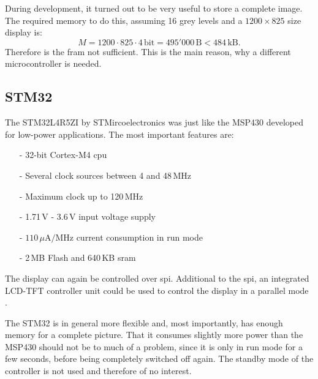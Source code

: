 During development, it turned out to be very useful to store a complete image.
The required memory to do this, assuming 16 grey levels and a $1200\times 825$ size display is:
$$M = 1200\cdot 825\cdot4\,\text{bit}=495'000\,\text{B} < 484\,\text{kB}.$$
Therefore is the \acs{fram} not sufficient.
This is the main reason, why a different microcontroller is needed.

\subsection{STM32}
The STM32L4R5ZI by STMircoelectronics was just like the MSP430 developed for low-power applications.
The most important features are:
\begin{itemize}
	\item[-] 32-bit Cortex-M4 \acs{cpu}
	\item[-] Several clock sources between 4 and 48\,MHz
	\item[-] Maximum clock up to 120\,MHz
	\item[-] 1.71\,V - 3.6\,V input voltage supply
	\item[-] $110\,\mu \text{A}/\text{MHz}$ current consumption in run mode
	\item[-] 2\,MB Flash and 640\,KB \acs{sram}
\end{itemize}
The display can again be controlled over \acs{spi}.
Additional to the \acs{spi}, an integrated LCD-TFT controller unit could be used to control the display in a parallel mode \cite{stm32}.

The STM32 is in general more flexible and, most importantly, has enough memory for a complete picture.
That it consumes slightly more power than the MSP430 should not be to much of a problem, since it is only in run mode for a few seconds, before being completely switched off again.
The standby mode of the controller is not used and therefore of no interest.


